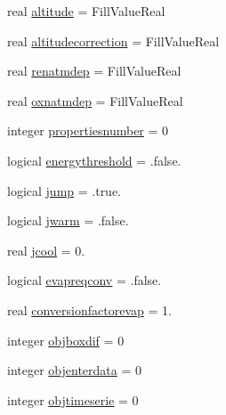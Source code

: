 \begin{DoxyCompactItemize}
\item 
real \mbox{\hyperlink{structmoduleinterfacewaterair_1_1t__interfacewaterair_abd514b64d6341e28ce136e9d1cc271d6}{altitude}} = Fill\+Value\+Real
\item 
real \mbox{\hyperlink{structmoduleinterfacewaterair_1_1t__interfacewaterair_a0ef47de07c36dc08f3410726e6670cc1}{altitudecorrection}} = Fill\+Value\+Real
\item 
real \mbox{\hyperlink{structmoduleinterfacewaterair_1_1t__interfacewaterair_ad1a591491542262cdc0fe16f321a4f51}{renatmdep}} = Fill\+Value\+Real
\item 
real \mbox{\hyperlink{structmoduleinterfacewaterair_1_1t__interfacewaterair_ad6951fa97325144bcb7aba5170d19623}{oxnatmdep}} = Fill\+Value\+Real
\item 
integer \mbox{\hyperlink{structmoduleinterfacewaterair_1_1t__interfacewaterair_a2e7b34e6a47e0cd2397d5fef02f954db}{propertiesnumber}} = 0
\item 
logical \mbox{\hyperlink{structmoduleinterfacewaterair_1_1t__interfacewaterair_aa1079ffe15c6a39c44e49034895efcf1}{energythreshold}} = .false.
\item 
logical \mbox{\hyperlink{structmoduleinterfacewaterair_1_1t__interfacewaterair_a90c309461fe57ec2439b9868cff73904}{jump}} = .true.
\item 
logical \mbox{\hyperlink{structmoduleinterfacewaterair_1_1t__interfacewaterair_a0b06ff291167358791f5f6b39a4cd45f}{jwarm}} = .false.
\item 
real \mbox{\hyperlink{structmoduleinterfacewaterair_1_1t__interfacewaterair_a87cb54251ac784f375c5300e37fba3b0}{jcool}} = 0.
\item 
logical \mbox{\hyperlink{structmoduleinterfacewaterair_1_1t__interfacewaterair_a9a73cf553eef59fd7ba8a1a71221bdc8}{evapreqconv}} = .false.
\item 
real \mbox{\hyperlink{structmoduleinterfacewaterair_1_1t__interfacewaterair_a833013655a8b2849c909007bff1d0fc8}{conversionfactorevap}} = 1.
\item 
integer \mbox{\hyperlink{structmoduleinterfacewaterair_1_1t__interfacewaterair_a50345426c5c03e39e79883247b9799fa}{objboxdif}} = 0
\item 
integer \mbox{\hyperlink{structmoduleinterfacewaterair_1_1t__interfacewaterair_a19c25f804b4cefcea62a503279c3fa45}{objenterdata}} = 0
\item 
integer \mbox{\hyperlink{structmoduleinterfacewaterair_1_1t__interfacewaterair_a5fffde334e600470dcdb009c366c6288}{objtimeserie}} = 0
\item 

\end{DoxyCompactItemize}
